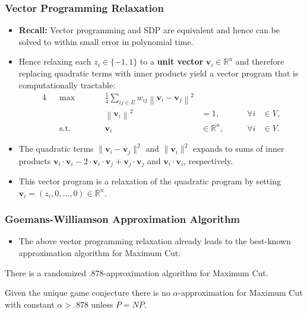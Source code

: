 \documentclass{beamer}
\newcommand{\RR}{\mathbb{R}}
\begin{document}
    \begin{frame}
        \frametitle{Vector Programming Relaxation}
    
        \begin{itemize}
            \item {\bf Recall:} Vector programming and SDP are equivalent and hence can be solved to within small error in polynomial time. \pause
            \item Hence relaxing each $z_i \in \{ -1, 1 \}$ to a {\bf unit vector} $\mathbf v_i \in \RR^n$ and therefore replacing quadratic terms with inner products yield a vector program that is computationally tractable:
            \begin{alignat*}{4}
                && \max \qquad && \frac{1}{4} \sum_{ij \in E} w_{ij} \left\lVert \mathbf v_i - \mathbf v_j \right\rVert^2 \\
                && && \left\lVert \mathbf v_i \right\rVert^2 &= 1, & \qquad \forall i & \in V, \\
                && \text{s.t.} \qquad && \mathbf v_i & \in \RR^n, & \qquad \forall i & \in V.
              \end{alignat*}
              \pause
              \vspace{-1em}
              \item The quadratic terms $\lVert \mathbf v_i - \mathbf v_j \rVert^2$ and $\lVert \mathbf v_i \rVert^2$ expands to sums of inner products $\mathbf v_i \cdot \mathbf v_i - 2 \cdot \mathbf v_i \cdot \mathbf v_j + \mathbf v_j \cdot \mathbf v_j$ and $\mathbf v_i \cdot \mathbf v_i$, respectively. \pause
              \item This vector program is a relaxation of the quadratic program by setting $\mathbf v_i = (z_i, 0, \ldots, 0) \in \RR^n$.
        \end{itemize}
    \end{frame}

    \begin{frame}
        \frametitle{Goemans-Williamson Approximation Algorithm}

        \begin{itemize}
            \item The above vector programming relaxation already leads to the best-known approximation algorithm for {\sc Maximum Cut}:
        \end{itemize}

        \pause

        \begin{theorem}
            There is a randomized $.878$-approximation algorithm for {\sc Maximum Cut}.
        \end{theorem}

        \pause

        \begin{theorem}
            Given the unique game conjecture there is no $\alpha$-approximation for {\sc Maximum Cut} with constant $\alpha > .878$ unless $P = NP$.
        \end{theorem}
    \end{frame}
\end{document}
